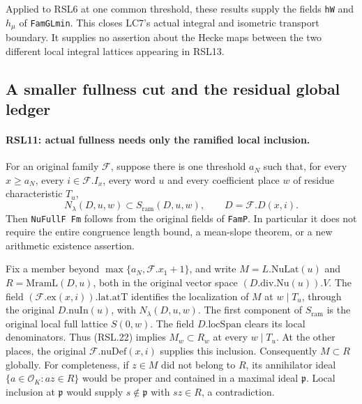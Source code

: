 Applied to RSL6 at one common threshold, these results supply
the fields \texttt{hW} and $h_\mu$ of
\texttt{FamGLmin}.  This closes LC7's actual integral and
isometric transport boundary.  It supplies no assertion
about the Hecke maps between the two different local
integral lattices appearing in RSL13.

\subsection{A smaller fullness cut and the residual global ledger}

\paragraph{RSL11: actual fullness needs only the ramified local inclusion.}
\label{claim:RSL11}
For an original family $\mathcal F$, suppose there is one
threshold $a_N$ such that, for every $x\ge a_N$, every
$i\in\mathcal F.I_x$, every word $u$ and every coefficient
place $w$ of residue characteristic $T_u$,
\[
                N_\lambda(D,u,w)\subset S_{\mathrm{ram}}(D,u,w),
       \qquad D=\mathcal F.D(x,i).                    \tag{RSL.22}
\]
Then \texttt{NuFullF Fm} follows from the original fields of
\texttt{FamP}.  In particular it does not require the entire
congruence length bound, a mean-slope theorem, or a new
arithmetic existence assertion.

Fix a member beyond $\max\{a_N,\mathcal F.x_1+1\}$, and write
$M=L.\mathrm{NuLat}(u)$ and
$R=\mathrm{MramL}(D,u)$, both in the original vector space
$(D.\mathrm{div}.\mathrm{Nu}(u)).V$.  The field
$(\mathcal F.\mathrm{ex}(x,i)).\mathrm{lat}.\mathrm{atT}$
identifies the localization of $M$ at $w\mid T_u$, through
the original $D.\mathrm{nuIn}(u)$, with $N_\lambda(D,u,w)$.
The first component of $S_{\mathrm{ram}}$ is the original
local full lattice $S(0,w)$.  The field $D.\mathrm{locSpan}$
clears its local denominators.  Thus (RSL.22) implies
$M_w\subset R_w$ at every $w\mid T_u$.
At the other places, the original
$\mathcal F.\mathrm{nuDef}(x,i)$ supplies this inclusion.
Consequently $M\subset R$ globally.  For completeness, if
$z\in M$ did not belong to $R$, its annihilator ideal
$\{a\in\mathcal O_K:az\in R\}$ would be proper and
contained in a maximal ideal $\mathfrak p$.  Local inclusion
at $\mathfrak p$ would supply $s\notin\mathfrak p$ with
$sz\in R$, a contradiction.

